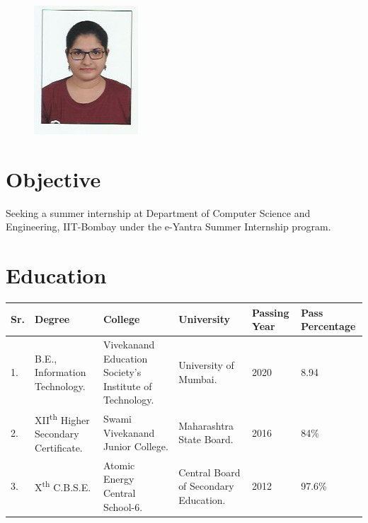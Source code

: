 \documentclass[margin]{res}
\begin{document}
\newcommand{\ts}{\textsuperscript} 

\address{{\bf Address} \\91 A, Kamgar Nagar \\ Kurla East \\ Mumbai 400024}
\address{{\bf Contact Details} \\Mob: +91-9920697529 \\ Email: gayatri.belapurkar5@gmail.com}

\begin{resume}

\begin{figure}[h!]
    \includegraphics[scale=0.5]{Photo_gayatri.jpeg}
\end{figure}

\section{Objective}
Seeking a summer internship at Department of Computer Science and Engineering, IIT-Bombay under the e-Yantra Summer Internship program. 

\section{Education}
\begin{table}[h!]
  \begin{tabular}{p{0.5cm}|p{4cm}|p{3.5cm}|p{2cm}|p{1.5cm}|p{1.6cm}}
    \textbf{Sr.} & \textbf{Degree} & \textbf{College} & \textbf{University} & \textbf{Passing Year} & \textbf{Pass Percentage} \\
    \hline
    1. & B.E., Information Technology. & Vivekanand Education Society's Institute of Technology. & University of Mumbai. & 2020 & 8.94\\
    2. & XII\ts{th} Higher Secondary Certificate. & Swami Vivekanand Junior College. & Maharashtra State Board. & 2016 & 84\%\\
    3. & X\ts{th }C.B.S.E. & Atomic Energy Central School-6. & Central Board of Secondary Education. & 2012 &  97.6\%\\
    \end{tabular}
\end{table}


\end{resume}
\end{document}

